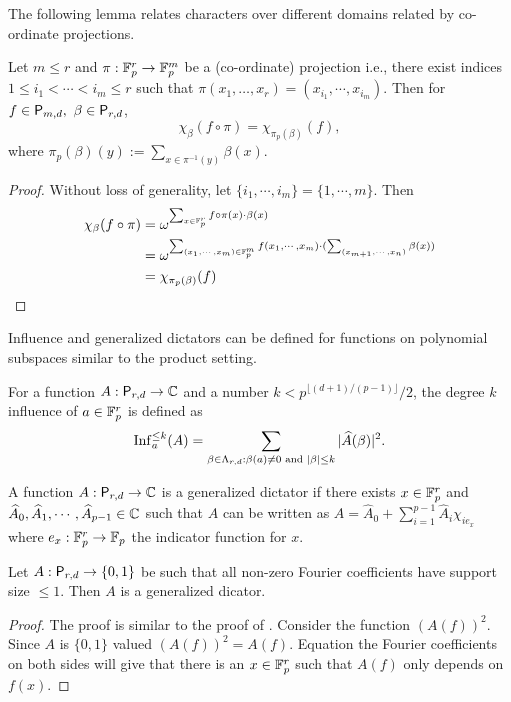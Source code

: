 The following lemma relates
characters over different domains related by co-ordinate projections.
\begin{lemma} \label{lem:char-projection} 
Let $m \leq r$ and $\pi:\mathbb F_p^r
\rightarrow \mathbb F_p^m$ be a (co-ordinate) projection i.e., there exist indices $1
\leq i_1 < \cdots < i_m \leq r$ such that $\pi(x_1,\dots,x_r) = (x_{i_1}, \cdots
,x_{i_m})$. Then for $f \in \mathsf P_{m,d}, ~\beta \in \mathsf P_{r,d}$,
$$\chi_\beta(f\circ \pi)= \chi_{\pi_p(\beta)}(f),$$ 
where $\pi_p(\beta)(y):=\sum_{x \in \pi^{-1}(y)} \beta(x)$. 
\end{lemma}
\begin{proof}
Without loss of generality, let $\{i_1, \cdots, i_m\} = \{1,\cdots, m\}$. Then
\begin{align*}
 \chi_\beta(f\circ \pi) &= \omega^{\sum_{x \in \mathbb F_p^r} f\circ \pi(x) \cdot \beta(x)} \\
&= \omega^{\sum_{(x_1,\cdots,x_m) \in \mathbb F_p^m} f(x_1,\cdots,x_m)\cdot( \sum_{(x_{m+1},\cdots, x_n)} \beta(x))}\\
&= \chi_{\pi_p(\beta)}(f)
\end{align*}
\end{proof}

Influence and generalized dictators can be defined for functions on polynomial subspaces
similar to the product setting.

\begin{definition}[Influence] For a function $A:\mathsf P_{r,d} \rightarrow \mathbb C$ and a
number $k < p^{\lfloor (d+1)/(p-1) \rfloor}/2$, the degree $k$ influence of $a\in
\mathbb F_p^r$ is defined as 
$$\mbox{\textnormal{Inf}}^{\leq k}_a(A) = \sum_{\beta \in \Lambda_{r,d}:\beta(a) 
\neq 0 \text{ and } |\beta| \leq k} |\widehat A(\beta)|^2.$$ 
\end{definition}


\begin{definition} A function $A:\mathsf P_{r,d} \rightarrow \mathbb C$ is a
generalized dictator if there exists $x\in \mathbb F_p^r$ and $\widehat A_0, \widehat A_{1}, \cdots,
\widehat A_{p-1} \in \mathbb C$ such that $A$ can be written as $A = \widehat A_0 +
\sum_{i=1}^{p-1} \widehat A_{i}\chi_{ie_x}$ where $e_x:\mathbb F_p^r
\rightarrow \mathbb F_p$ the indicator function for $x$. 
\end{definition}

\begin{lemma}\label{lem:level1-dict}
Let $A:\mathsf P_{r,d} \rightarrow \{0,1\}$ be such that all non-zero
Fourier coefficients have support size $\leq 1$. Then $A$ is a generalized dicator.
\end{lemma}
\begin{proof}
The proof is similar to the proof of \cite[Lemma 2.3]{AlonDFS2004}. Consider the function $(A(f))^2$. Since $A$ is $\{0,1\}$ valued $(A(f))^2 = A(f)$. Equation the Fourier coefficients on both sides will give that there is an $x\in \mathbb F_p^r$ such that $A(f)$ only depends on $f(x)$.
\end{proof}




